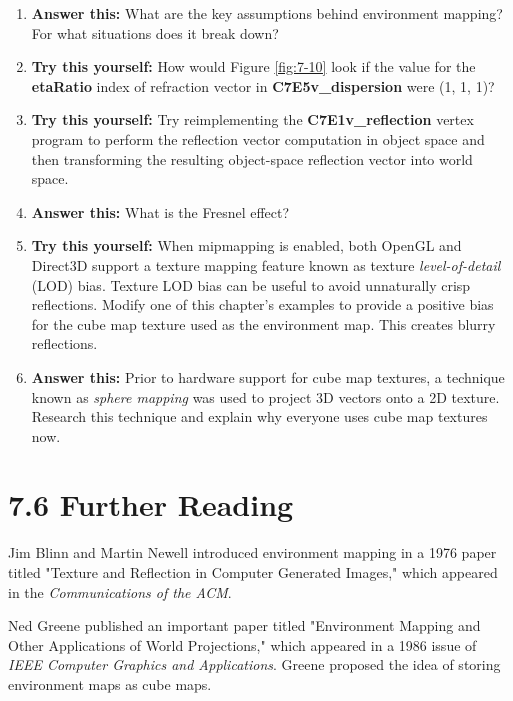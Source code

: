 \documentclass[../main.tex]{subfiles}
\begin{document}
\begin{enumerate}

\item \textbf{Answer this:} What are the key assumptions behind environment mapping? For what situations does it break down?

\item \textbf{Try this yourself:} How would Figure \ref{fig:7-10} look if the value for the \textbf{etaRatio} index of refraction vector in \textbf{C7E5v_dispersion} were (1, 1, 1)?

\item \textbf{Try this yourself:} Try reimplementing the \textbf{C7E1v_reflection} vertex program to perform the reflection vector computation in object space and then transforming the resulting object-space reflection vector into world space.

\item \textbf{Answer this:} What is the Fresnel effect?

\item \textbf{Try this yourself:} When mipmapping is enabled, both OpenGL and Direct3D support a texture mapping feature known as texture \textit{level-of-detail} (LOD) bias. Texture LOD bias can be useful to avoid unnaturally crisp reflections. Modify one of this chapter's examples to provide a positive bias for the cube map texture used as the environment map. This creates blurry reflections.

\item \textbf{Answer this:} Prior to hardware support for cube map textures, a technique known as \textit{sphere mapping} was used to project 3D vectors onto a 2D texture. Research this technique and explain why everyone uses cube map textures now.

\end{enumerate}

\section{7.6 Further Reading}

Jim Blinn and Martin Newell introduced environment mapping in a 1976 paper titled "Texture and Reflection in Computer Generated Images," which appeared in the \textit{Communications of the ACM}.

Ned Greene published an important paper titled "Environment Mapping and Other Applications of World Projections," which appeared in a 1986 issue of \textit{IEEE Computer Graphics and Applications}. Greene proposed the idea of storing environment maps as cube maps.
\end{document}
